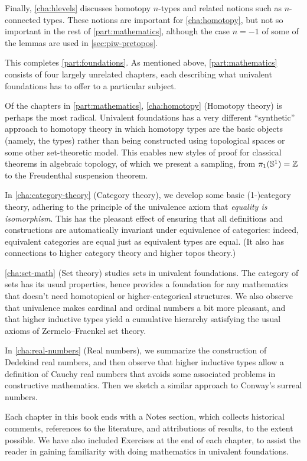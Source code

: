 Finally, \autoref{cha:hlevels} discusses homotopy $n$-types and related notions such as $n$-connected types.
These notions are important for \autoref{cha:homotopy}, but not so important in the rest of \autoref{part:mathematics}, although the case $n=-1$ of some of the lemmas are used in \autoref{sec:piw-pretopos}.

This completes \autoref{part:foundations}.
As mentioned above, \autoref{part:mathematics} consists of four largely unrelated chapters, each describing what univalent foundations has to offer to a particular subject.

Of the chapters in \autoref{part:mathematics}, \autoref{cha:homotopy} (Homotopy theory) is perhaps the most radical.
Univalent foundations has a very different ``synthetic'' approach to homotopy theory in which homotopy types are the basic objects (namely, the types) rather than being constructed using topological spaces or some other set-theoretic model.
This enables new styles of proof for classical theorems in algebraic topology, of which we present a sampling, from $\pi_1(\mathbb{S}^1)=\mathbb{Z}$ to the Freudenthal suspension theorem.

In \autoref{cha:category-theory} (Category theory), we develop some basic (1-)category theory, adhering to the principle of the univalence axiom that \emph{equality is isomorphism}.
This has the pleasant effect of ensuring that all definitions and constructions are automatically invariant under equivalence of categories: indeed, equivalent categories are equal just as equivalent types are equal.
(It also has connections to higher category theory and higher topos theory.)

\autoref{cha:set-math} (Set theory) studies sets in univalent foundations.
The category of sets has its usual properties, hence provides a foundation for any mathematics that doesn't need homotopical or higher-categorical structures.
We also observe that univalence makes cardinal and ordinal numbers a bit more pleasant, and that higher inductive types yield a cumulative hierarchy satisfying the usual axioms of Zermelo--Fraenkel set theory.

In \autoref{cha:real-numbers} (Real numbers), we summarize the construction of Dedekind real numbers, and then observe that higher inductive types allow a definition of Cauchy real numbers that avoids some associated problems in constructive mathematics.
Then we sketch a similar approach to Conway's surreal numbers.

Each chapter in this book ends with a Notes section, which collects historical comments, references to the literature, and attributions of results, to the extent possible.
We have also included Exercises at the end of each chapter, to assist the reader in gaining familiarity with doing mathematics in univalent foundations.

